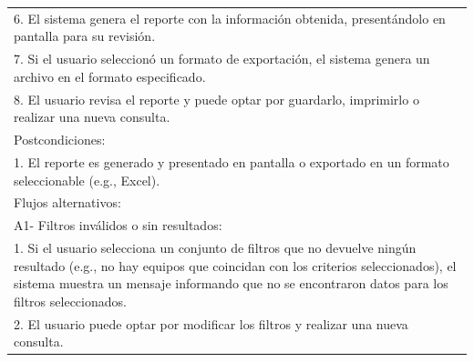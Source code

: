 \documentclass[stu, 12pt, letterpaper, donotrepeattitle, floatsintext, natbib]{apa7}
\begin{document}
\begin{longtable}{@{} p{16.5cm} @{}}
    6. El sistema genera el reporte con la información obtenida, presentándolo en pantalla para su revisión.                                                                                                                                                                   \\
    7. Si el usuario seleccionó un formato de exportación, el sistema genera un archivo en el formato especificado.                                                                                                                                                            \\
    8. El usuario revisa el reporte y puede optar por guardarlo, imprimirlo o realizar una nueva consulta.                                                                                                                                                                     \\ \midrule
    Postcondiciones:                                                                                                                                                                                                                                                           \\
    1. El reporte es generado y presentado en pantalla o exportado en un formato seleccionable (e.g., Excel).                                                                                                                                                                  \\ \midrule
    Flujos alternativos:                                                                                                                                                                                                                                                       \\
    A1- Filtros inválidos o sin resultados:                                                                                                                                                                                                                                    \\
    \hspace{1cm}1. Si el usuario selecciona un conjunto de filtros que no devuelve ningún resultado (e.g., no hay equipos que coincidan con los criterios seleccionados), el sistema muestra un mensaje informando que no se encontraron datos para los filtros seleccionados. \\
    \hspace{1cm}2. El usuario puede optar por modificar los filtros y realizar una nueva consulta.                                                                                                                                                                             \\

\end{longtable}
\end{document}
